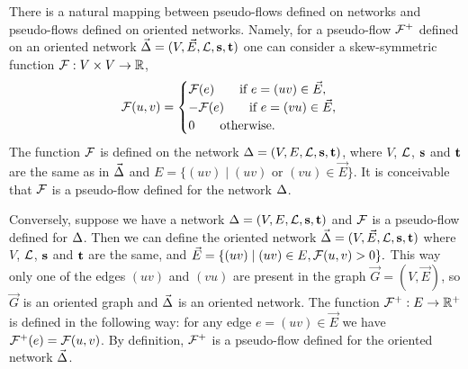 \documentclass[12pt,oneside,a4paper]{amsart}
\begin{document}
      \begin{remark}
        There is a natural mapping between pseudo-flows defined on networks and pseudo-flows defined on oriented networks.
          Namely, for a pseudo-flow $\mathcal{{F}^{+}}$ defined on an oriented network $\vec{\Delta} = (V, \vec{E}, \mathcal{L}, \mathbf{s}, \mathbf{t})$
          one can consider a skew-symmetric function
          $\mathcal{F}: V \times V \to \mathbb{R}$,
        \begin{align*}
          \mathcal{F}(u, v)=
          \begin{cases}
            \mathcal{F}(e) \qquad \text{if } e = (uv) \in \vec{E},\\
            -\mathcal{F}(e) \qquad \text{if } e = (vu) \in \vec{E}, \\
            0 \qquad \text{otherwise}.
          \end{cases}
        \end{align*}
          The function $\mathcal{F}$ is defined on the network $\Delta = (V, E, \mathcal{L}, \mathbf{s}, \mathbf{t})$, where $V$, $\mathcal{L}$, $\mathbf{s}$ and $\mathbf{t}$ are the same
          as in $\vec{\Delta}$ and $E = \{(uv) \mid (uv) \text{ or } (vu) \in \vec{E}\}$.
          It is conceivable that $\mathcal{F}$ is a pseudo-flow defined for the network $\Delta$.

        Conversely, suppose we have a network $\Delta = (V, E, \mathcal{L}, \mathbf{s}, \mathbf{t})$ and $\mathcal{F}$ is a pseudo-flow defined
          for $\Delta$.
        Then we can define the oriented network $\vec{\Delta} = (V, \vec{E}, \mathcal{L}, \mathbf{s}, \mathbf{t})$ where $V$, $\mathcal{L}$, $\mathbf{s}$ and $\mathbf{t}$
          are the same, and $\vec{E} = \{(uv) \mid (uv) \in E, \mathcal{F}(u, v) > 0 \}.$
        This way only one of the edges $(uv)$ and $(vu)$ are present in the graph $\vec{G} = (V, \vec{E})$,
          so $\vec{G}$ is an oriented graph and $\vec{\Delta}$ is an oriented network.
        The function $\mathcal{{F}^{+}}: E \to \mathbb{R}^{+}$ is defined in the following way:
          for any edge $e =(uv) \in \vec{E}$ we have $\mathcal{{F}^{+}}(e) = \mathcal{F}(u,v)$.
        By definition, $\mathcal{{F}^{+}}$ is a pseudo-flow defined for the oriented network $\vec{\Delta}$.
      \end{remark}
\end{document}
